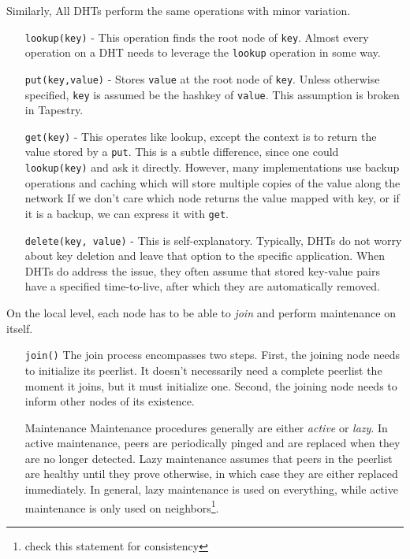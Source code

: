 Similarly, All DHTs perform the same operations with minor variation.
\begin{enumerate}
	\item[\texttt{lookup(key)}] - This operation finds the root node of \texttt{key}.
	Almost every operation on a DHT needs to leverage the \texttt{lookup} operation in some way.
	\item[\texttt{put(key,value)}] - Stores \texttt{value} at the root node of \texttt{key}.
	Unless otherwise specified, \texttt{key} is assumed be the hashkey of \texttt{value}.
	This assumption is broken in Tapestry.
	\item[\texttt{get(key)}] - This operates like lookup, except the context is to return the value stored by a \texttt{put}.
	This is a subtle difference, since one could \texttt{lookup(key)} and ask it directly.
	However, many implementations use backup operations and caching which will store multiple copies of the value along the network
	If we don't care which node returns the value mapped with key, or if it is a backup,  we can express it with \texttt{get}.
	\item[\texttt{delete(key, value)}] - This is self-explanatory.  Typically, DHTs do not worry about key deletion and leave that option to the specific application.
    When DHTs do address the issue, they often assume that stored key-value pairs have a specified time-to-live, after which they are automatically removed.
\end{enumerate}

On the local level, each node has to be able to \textit{join }and perform maintenance on itself.
\begin{enumerate}
	\item[\texttt{join()}]  The join process encompasses two steps.
    First, the joining node needs to initialize its peerlist. 
    It doesn't necessarily need a complete peerlist the moment it joins, but it must initialize one. 
    Second, the joining node needs to inform other nodes of its existence.
    \item[Maintenance]  Maintenance procedures generally are either \textit{active} or \textit{lazy}.
    In active maintenance, peers are periodically pinged and are replaced when they are no longer detected.
    Lazy maintenance assumes that peers in the peerlist are healthy until they prove otherwise, in which case they are either replaced immediately.
    In general, lazy maintenance is used on everything, while active maintenance is only used on neighbors\footnote{check this statement for consistency}.
    
\end{enumerate}

